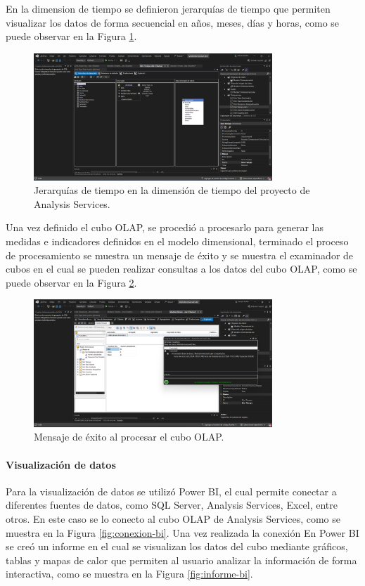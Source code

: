 En la dimension de tiempo se definieron jerarquías de tiempo que permiten visualizar los datos de forma secuencial en años, meses,
días y horas, como se puede observar en la Figura \ref{fig:dimension-tiempo-olap}.

\begin{figure}[H]
    \centering
    \includegraphics[width=0.8\textwidth]{chapters/III-resultados-y-discusion/resources/images/dimension-tiempo-olap.png}
    \caption{Jerarquías de tiempo en la dimensión de tiempo del proyecto de Analysis Services.}
    \label{fig:dimension-tiempo-olap}
\end{figure}

Una vez definido el cubo OLAP, se procedió a procesarlo para generar las medidas e indicadores definidos en el modelo dimensional, terminado
el proceso de procesamiento se muestra un mensaje de éxito y se muestra el examinador de cubos en el cual se pueden realizar consultas a los
datos del cubo OLAP, como se puede observar en la Figura \ref{fig:exito-olap}.

\begin{figure}[H]
    \centering
    \includegraphics[width=0.8\textwidth]{chapters/III-resultados-y-discusion/resources/images/exito-olap.png}
    \caption{Mensaje de éxito al procesar el cubo OLAP.}
    \label{fig:exito-olap}
\end{figure}

\paragraph{Visualización de datos}
Para la visualización de datos se utilizó Power BI, el cual permite conectar a diferentes fuentes de datos, como SQL Server, Analysis Services,
Excel, entre otros. En este caso se lo conecto al cubo OLAP de Analysis Services, como se muestra en la Figura \ref{fig:conexion-bi}. Una vez
realizada la conexión En Power BI se creó un informe en el cual se visualizan los datos del cubo  mediante gráficos, tablas y mapas de calor
que permiten al usuario analizar la información de forma interactiva, como se muestra en la Figura \ref{fig:informe-bi}.

